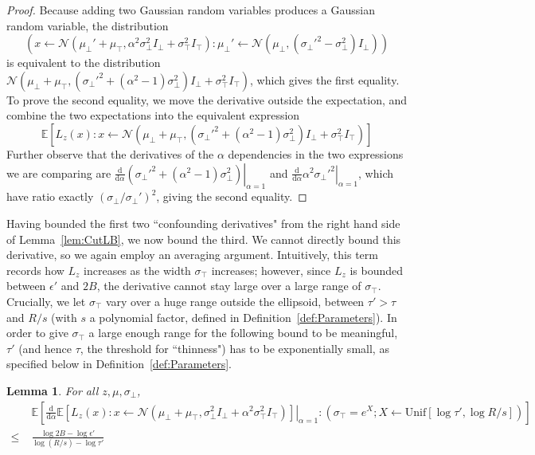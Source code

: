 \documentclass[11pt,letter]{article}
\newcommand{\Exp}{\mathbb{E}}
\newcommand{\from}{\leftarrow}
\newcommand{\Normal}{\mathcal{N}}
\newcommand{\Unif}{\mathrm{Unif}}
\renewcommand{\d}{\mathrm{d}}
\newcommand{\Diff}[2][]{\frac{\d#1}{\d#2}}
\newcommand{\ferr}{\epsilon}
\newcommand{\safety}{s}
\newcounter{nTheorems}
\numberwithin{nTheorems}{section}
\newtheorem{lemma}[nTheorems]{Lemma}
\begin{document}
\begin{proof}
Because adding two Gaussian random variables produces a Gaussian random variable, the distribution
$$ (x \from \Normal(\mu_\bot' + \mu_\top, \alpha^2\sigma_\bot^2 I_\bot + \sigma_\top^2 I_\top) : \mu_\bot' \from \Normal(\mu_\bot, (\sigma_\bot'^2 - \sigma_\bot^2)I_\bot)) $$
is equivalent to the distribution $\Normal(\mu_\bot + \mu_\top, (\sigma_\bot'^2 + (\alpha^2-1)\sigma_\bot^2)I_\bot + \sigma_\top^2 I_\top)$, which gives the first equality.
To prove the second equality, we move the derivative outside the expectation, and combine the two expectations into the equivalent expression \[
 \Exp\left[L_z(x) : x \from \Normal(\mu_\bot + \mu_\top, (\sigma_\bot'^2+(\alpha^2-1)\sigma_\bot^2) I_\bot + \sigma_\top^2 I_\top) \right]
\]
Further observe that the derivatives of the $\alpha$ dependencies in the two expressions we are comparing are $\left.\Diff{\alpha} (\sigma_\bot'^2 + (\alpha^2-1)\sigma_\bot^2)\right|_{\alpha = 1}$ and $\left.\Diff{\alpha} \alpha^2 \sigma_\bot'^2\right|_{\alpha = 1}$, which have ratio exactly $(\sigma_\bot/\sigma_\bot')^2$, giving the second equality.
\end{proof}





Having bounded the first two ``confounding derivatives" from the right hand side of Lemma~\ref{lem:CutLB}, we now bound the third. We cannot directly bound this derivative, so we again employ an averaging argument. Intuitively, this term records how $L_z$ increases as the width $\sigma_\top$ increases; however, since $L_z$ is bounded between $\ferr'$ and $2B$, the derivative cannot stay large over a large range of $\sigma_\top$. Crucially, we let $\sigma_\top$ vary over a huge range outside the ellipsoid, between $\tau'>\tau$ and $R/\safety$ (with $\safety$ a polynomial factor, defined in Definition~\ref{def:Parameters}).
In order to give $\sigma_\top$ a large enough range for the following bound to be meaningful, $\tau'$ (and hence $\tau$, the threshold for ``thinness") has to be exponentially small, as specified below in Definition~\ref{def:Parameters}.
\begin{lemma}
\label{lem:SigmaTopExpectation}
For all $z, \mu, \sigma_\bot$,
\begin{align*}
&\Exp\left[\left.\Diff{\alpha} \Exp\left[L_z(x) : x \from \Normal(\mu_\bot + \mu_\top, \sigma_\bot^2 I_\bot + \alpha^2\sigma_\top^2 I_\top) \right]\right|_{\alpha = 1} : (\sigma_\top = e^X; X \from \Unif[\log \tau', \log R/\safety])\right]\\
\le\;&\frac{\log 2B - \log \epsilon'}{\log (R/\safety) - \log \tau'}
\end{align*}
\end{lemma}
\end{document}
